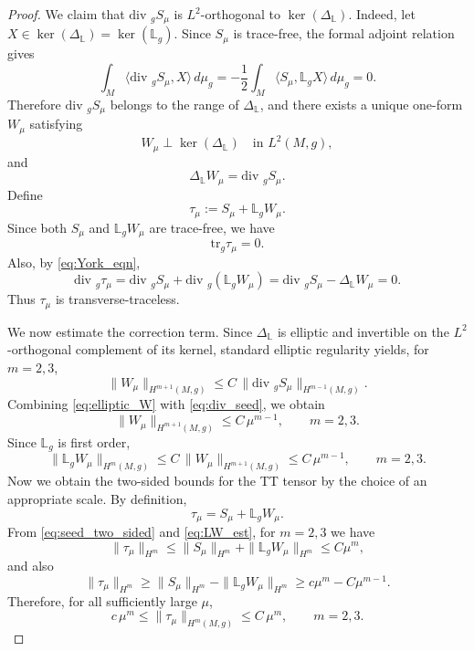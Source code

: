 \documentclass{amsart}
\renewcommand{\div}{\mbox{div }}
\newcommand{\tr}{\mbox{tr}}
\begin{document}
\begin{proof}
\noindent We claim that $\div_{g}S_{\mu}$ is $L^{2}$-orthogonal to $\ker(\Delta_{\mathbb L})$. Indeed, let $X\in \ker(\Delta_{\mathbb L})=\ker(\mathbb L_{g})$. Since $S_{\mu}$ is trace-free, the formal adjoint relation gives
\[
\int_{M}\langle \div_{g}S_{\mu},X\rangle\,d\mu_{g}
=
-\frac12\int_{M}\langle S_{\mu},\mathbb L_{g}X\rangle\,d\mu_{g}
=0.
\]
Therefore $\div_{g}S_{\mu}$ belongs to the range of $\Delta_{\mathbb L}$, and there exists a unique one-form $W_{\mu}$ satisfying
\[
W_{\mu}\perp \ker(\Delta_{\mathbb L}) \quad\text{in }L^{2}(M,g),
\]
and
\begin{equation}
\label{eq:York_eqn}
\Delta_{\mathbb L}W_{\mu}=\div_{g}S_{\mu}.
\end{equation}
Define
\[
\tau_{\mu}:=S_{\mu}+\mathbb L_{g}W_{\mu}.
\]
Since both $S_{\mu}$ and $\mathbb L_{g}W_{\mu}$ are trace-free, we have
\[
\tr_{g}\tau_{\mu}=0.
\]
Also, by \eqref{eq:York_eqn},
\[
\div_{g}\tau_{\mu}
=
\div_{g}S_{\mu}+\div_{g}(\mathbb L_{g}W_{\mu})
=
\div_{g}S_{\mu}-\Delta_{\mathbb L}W_{\mu}
=0.
\]
Thus $\tau_{\mu}$ is transverse-traceless.

\smallskip
\noindent We now estimate the correction term. Since $\Delta_{\mathbb L}$ is elliptic and invertible on the $L^{2}$-orthogonal complement of its kernel, standard elliptic regularity yields, for $m=2,3$,
\begin{equation}
\label{eq:elliptic_W}
\|W_{\mu}\|_{H^{m+1}(M,g)}
\leq
C\,\|\div_{g}S_{\mu}\|_{H^{m-1}(M,g)}.
\end{equation}
Combining \eqref{eq:elliptic_W} with \eqref{eq:div_seed}, we obtain
\[
\|W_{\mu}\|_{H^{m+1}(M,g)}\leq C\,\mu^{m-1},
\qquad m=2,3.
\]
Since $\mathbb L_{g}$ is first order,
\begin{equation}
\label{eq:LW_est}
\|\mathbb L_{g}W_{\mu}\|_{H^{m}(M,g)}
\leq
C\,\|W_{\mu}\|_{H^{m+1}(M,g)}
\leq C\,\mu^{m-1},
\qquad m=2,3.
\end{equation}
\noindent Now we obtain the two-sided bounds for the TT tensor by the choice of an appropriate scale. By definition,
\[
\tau_{\mu}=S_{\mu}+\mathbb L_{g}W_{\mu}.
\]
From \eqref{eq:seed_two_sided} and \eqref{eq:LW_est}, for $m=2,3$ we have
\[
\|\tau_{\mu}\|_{H^{m}}
\leq
\|S_{\mu}\|_{H^{m}}+\|\mathbb L_{g}W_{\mu}\|_{H^{m}}
\leq C\mu^{m},
\]
and also
\[
\|\tau_{\mu}\|_{H^{m}}
\geq
\|S_{\mu}\|_{H^{m}}-\|\mathbb L_{g}W_{\mu}\|_{H^{m}}
\geq
c\mu^{m}-C\mu^{m-1}.
\]
Therefore, for all sufficiently large $\mu$,
\begin{equation}
\label{eq:tau_two_sided}
c\,\mu^{m}\leq \|\tau_{\mu}\|_{H^{m}(M,g)}\leq C\,\mu^{m},
\qquad m=2,3.
\end{equation}


\end{proof}
\end{document}
